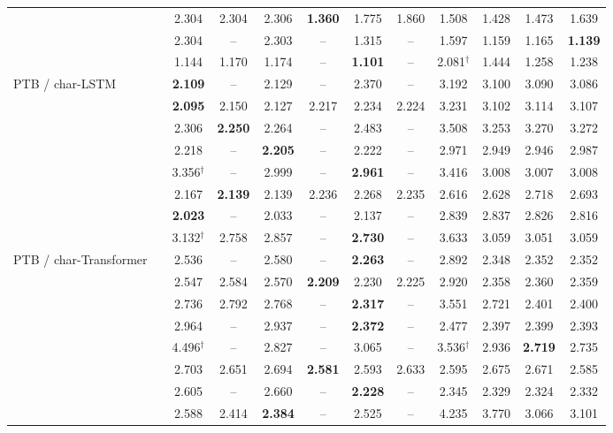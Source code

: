 \begin{tabular}{ll ccc ccc cccc}
 & \ANPb{} & 2.304 & 2.304 & 2.306 & \textbf{1.360} & 1.775 & 1.860 & 1.508 & 1.428 & 1.473 & 1.639 \\
 & \INP{} & 2.304 & -- & 2.303 & -- & 1.315 & -- & 1.597 & 1.159 & 1.165 & \textbf{1.139} \\
 & \DANP{} & 1.144 & 1.170 & 1.174 & -- & \textbf{1.101} & -- & 2.081$^\dagger$ & 1.444 & 1.258 & 1.238 \\
\midrule
PTB / char-LSTM & \SPSA{} & \textbf{2.109} & -- & 2.129 & -- & 2.370 & -- & 3.192 & 3.100 & 3.090 & 3.086 \\
 & \SPSAb{} & \textbf{2.095} & 2.150 & 2.127 & 2.217 & 2.234 & 2.224 & 3.231 & 3.102 & 3.114 & 3.107 \\
 & \RS{} & 2.306 & \textbf{2.250} & 2.264 & -- & 2.483 & -- & 3.508 & 3.253 & 3.270 & 3.272 \\
 & \NP{} & 2.218 & -- & \textbf{2.205} & -- & 2.222 & -- & 2.971 & 2.949 & 2.946 & 2.987 \\
 & \ANP{} & 3.356$^\dagger$ & -- & 2.999 & -- & \textbf{2.961} & -- & 3.416 & 3.008 & 3.007 & 3.008 \\
 & \ANPb{} & 2.167 & \textbf{2.139} & 2.139 & 2.236 & 2.268 & 2.235 & 2.616 & 2.628 & 2.718 & 2.693 \\
 & \INP{} & \textbf{2.023} & -- & 2.033 & -- & 2.137 & -- & 2.839 & 2.837 & 2.826 & 2.816 \\
 & \DANP{} & 3.132$^\dagger$ & 2.758 & 2.857 & -- & \textbf{2.730} & -- & 3.633 & 3.059 & 3.051 & 3.059 \\
\midrule
PTB / char-Transformer & \SPSA{} & 2.536 & -- & 2.580 & -- & \textbf{2.263} & -- & 2.892 & 2.348 & 2.352 & 2.352 \\
 & \SPSAb{} & 2.547 & 2.584 & 2.570 & \textbf{2.209} & 2.230 & 2.225 & 2.920 & 2.358 & 2.360 & 2.359 \\
 & \RS{} & 2.736 & 2.792 & 2.768 & -- & \textbf{2.317} & -- & 3.551 & 2.721 & 2.401 & 2.400 \\
 & \NP{} & 2.964 & -- & 2.937 & -- & \textbf{2.372} & -- & 2.477 & 2.397 & 2.399 & 2.393 \\
 & \ANP{} & 4.496$^\dagger$ & -- & 2.827 & -- & 3.065 & -- & 3.536$^\dagger$ & 2.936 & \textbf{2.719} & 2.735 \\
 & \ANPb{} & 2.703 & 2.651 & 2.694 & \textbf{2.581} & 2.593 & 2.633 & 2.595 & 2.675 & 2.671 & 2.585 \\
 & \INP{} & 2.605 & -- & 2.660 & -- & \textbf{2.228} & -- & 2.345 & 2.329 & 2.324 & 2.332 \\
 & \DANP{} & 2.588 & 2.414 & \textbf{2.384} & -- & 2.525 & -- & 4.235 & 3.770 & 3.066 & 3.101 \\
\bottomrule
\end{tabular}
